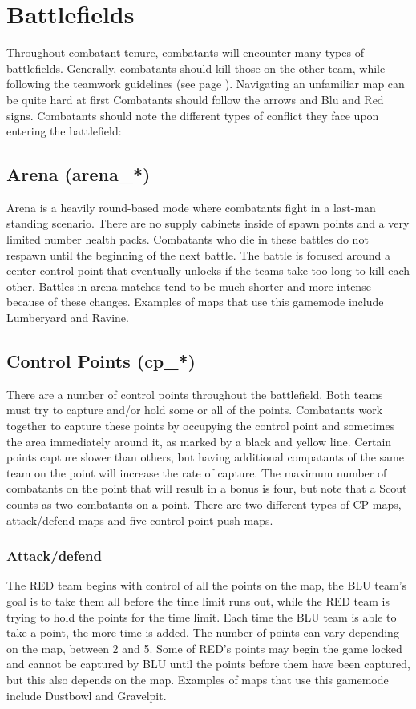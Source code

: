\section{Battlefields}
Throughout combatant tenure, combatants will encounter many types of battlefields. Generally, combatants should kill those on the other team, while following the teamwork guidelines (see page \pageref{Team_Strategy}). Navigating an unfamiliar map can be quite hard at first   Combatants should  follow the arrows and Blu and Red signs. Combatants should note the different types of conflict they face upon entering the battlefield:

\subsection{Arena (arena\_*)}
Arena is a heavily round-based mode where combatants fight in a last-man standing scenario. There are no supply cabinets inside of spawn points and a very limited number health packs. Combatants who die in these battles do not respawn until the beginning of the next battle.   The battle is focused around a center control point that eventually unlocks if the teams take too long to kill each other. Battles in arena matches tend to be much shorter and more intense because of these changes. Examples of maps that use this gamemode include Lumberyard and Ravine.

\subsection{Control Points (cp\_*)}
There are a number of control points throughout the battlefield. Both teams must try to capture and/or hold some or all of the points. Combatants work together to capture these points by occupying the control point and sometimes the area immediately around it, as marked by a black and yellow line. Certain points capture slower than others, but having additional compatants of the same team on the point will increase the rate of capture. The maximum number of combatants on the point that will result in a bonus is four, but note that a Scout counts as two combatants on a point. There are two different types of CP maps, attack/defend maps and five control point push maps. 
  
\subsubsection{Attack/defend}
The RED team begins with control of all the points on the map, the BLU team's goal is to take them all before the time limit runs out, while the RED team is trying to hold the points for the time limit. Each time the BLU team is able to take a point, the more time is added. The number of points can vary depending on the map, between 2 and 5. Some of RED's points may begin the game locked and cannot be captured by BLU until the points before them have been captured, but this also depends on the map. Examples of maps that use this gamemode include Dustbowl and Gravelpit.

